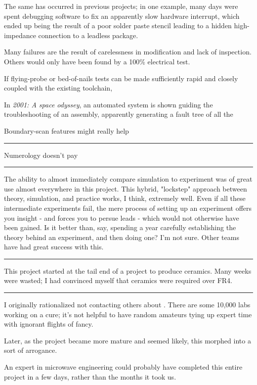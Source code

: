 \documentclass[paper.tex]{subfiles}
\begin{document}
The same has occurred in previous projects; in one example, many days were spent debugging software to fix an apparently slow hardware interrupt, which ended up being the result of a poor solder paste stencil leading to a hidden high-impedance connection to a leadless package.

Many failures are the result of carelessness in modification and lack of inspection. Others would only have been found by a 100\% electrical test.

If flying-probe or bed-of-nails tests can be made sufficiently rapid and closely coupled with the existing toolchain, 

In {\it 2001: A space odyssey}, an automated system is shown guiding the troubleshooting of an assembly, apparently generating a fault tree of all the 

Boundary-scan features might really help 

\rule{\linewidth}{0.2pt}

Numerology doesn't pay

\rule{\linewidth}{0.2pt}

The ability to almost immediately compare simulation to experiment was of great use almost everywhere in this project. This hybrid, "lockstep" approach between theory, simulation, and practice works, I think, extremely well. Even if all these intermediate experiments fail, the mere process of setting up an experiment offers you insight - and forces you to persue leads - which would not otherwise have been gained. Is it better than, say, spending a year carefully establishing the theory behind an experiment, and then doing one? I'm not sure. Other teams have had great success with this.

\rule{\linewidth}{0.2pt}

This project started at the tail end of a project to produce ceramics. Many weeks were wasted; I had convinced myself that ceramics were required over FR4. 

\rule{\linewidth}{0.2pt}

I originally rationalized not contacting others about . There are some 10,000 labs working on a cure; it's not helpful to have random amateurs tying up expert time with ignorant flights of fancy. 

Later, as the project became more mature and seemed likely, this morphed into a sort of arrogance.

An expert in microwave engineering could probably have completed this entire project in a few days, rather than the months it took us.
\end{document}
